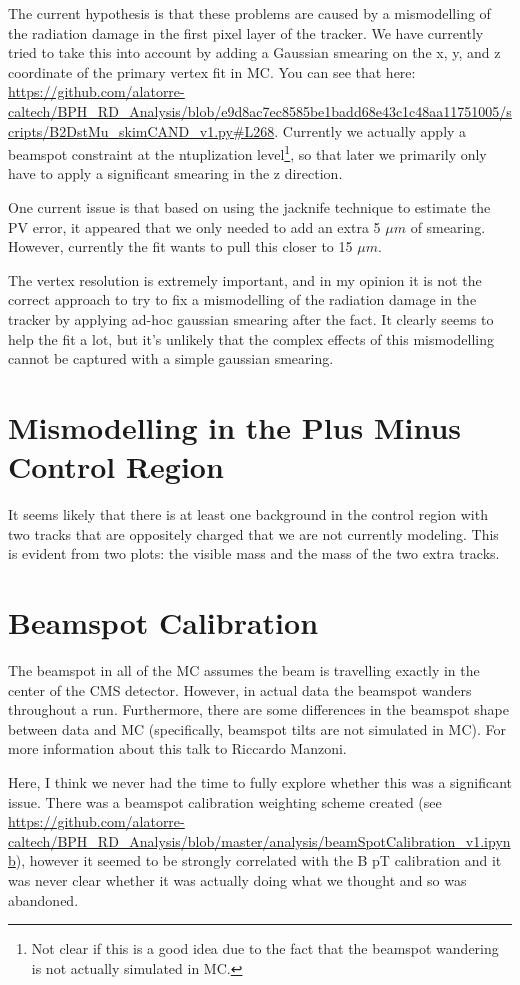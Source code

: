 \documentclass[12pt]{report}
\begin{document}
The current hypothesis is that these problems are caused by a mismodelling of
the radiation damage in the first pixel layer of the tracker. We have currently
tried to take this into account by adding a Gaussian smearing on the x, y, and
z coordinate of the primary vertex fit in MC. You can see that here:
\url{https://github.com/alatorre-caltech/BPH_RD_Analysis/blob/e9d8ac7ec8585be1badd68e43c1c48aa11751005/scripts/B2DstMu_skimCAND_v1.py#L268}.
Currently we actually apply a beamspot constraint at the ntuplization
level\footnote{Not clear if this is a good idea due to the fact that the
beamspot wandering is not actually simulated in MC.}, so that later we
primarily only have to apply a significant smearing in the z direction.

One current issue is that based on using the jacknife technique to estimate the
PV error, it appeared that we only needed to add an extra 5 $\mu m$ of
smearing. However, currently the fit wants to pull this closer to 15 $\mu m$.

The vertex resolution is extremely important, and in my opinion it is not the
correct approach to try to fix a mismodelling of the radiation damage in the
tracker by applying ad-hoc gaussian smearing after the fact. It clearly seems
to help the fit a lot, but it's unlikely that the complex effects of this
mismodelling cannot be captured with a simple gaussian smearing.

\section{Mismodelling in the Plus Minus Control Region}
It seems likely that there is at least one background in the control region
with two tracks that are oppositely charged that we are not currently modeling.
This is evident from two plots: the visible mass and the mass of the two extra
tracks.

\section{Beamspot Calibration}
The beamspot in all of the MC assumes the beam is travelling exactly in the
center of the CMS detector. However, in actual data the beamspot wanders
throughout a run. Furthermore, there are some differences in the beamspot shape
between data and MC (specifically, beamspot tilts are not simulated in MC). For
more information about this talk to Riccardo Manzoni.

Here, I think we never had the time to fully explore whether this was a
significant issue. There was a beamspot calibration weighting scheme created
(see
\url{https://github.com/alatorre-caltech/BPH_RD_Analysis/blob/master/analysis/beamSpotCalibration_v1.ipynb}),
however it seemed to be strongly correlated with the B pT calibration and it
was never clear whether it was actually doing what we thought and so was
abandoned.
\end{document}
